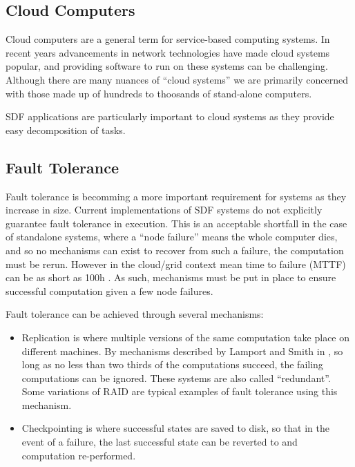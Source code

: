 \subsection{Cloud Computers}
Cloud computers are a general term for service-based computing systems.
In recent years advancements in network technologies have made cloud systems popular, and providing software to run on these systems can be challenging.
Although there are many nuances of ``cloud systems'' we are primarily concerned with those made up of hundreds to thoosands of stand-alone computers.

SDF applications are particularly important to cloud systems as they provide easy decomposition of tasks.

\subsection{Fault Tolerance}
Fault tolerance is becomming a more important requirement for systems as they increase in size.
Current implementations of SDF systems \cite{mal08, thies02, thies10} do not explicitly guarantee fault tolerance in execution.
This is an acceptable shortfall in the case of standalone systems, where a ``node failure'' means the whole computer dies, and so no mechanisms can exist to recover from such a failure, the computation must be rerun.
However in the cloud/grid context mean time to failure (MTTF) can be as short as 100h \cite{ree06}.
As such, mechanisms must be put in place to ensure successful computation given a few node failures.

Fault tolerance can be achieved through several mechanisms:
\begin{itemize}
	\item Replication is where multiple versions of the same computation take place on different machines.  By mechanisms described by Lamport and Smith in \cite{lam86}, so long as no less than two thirds of the computations succeed, the failing computations can be ignored.
			These systems are also called ``redundant''.  Some variations of RAID are typical examples of fault tolerance using this mechanism.
	\item Checkpointing is where successful states are saved to disk, so that in the event of a failure, the last successful state can be reverted to and computation re-performed.
\end{itemize}

